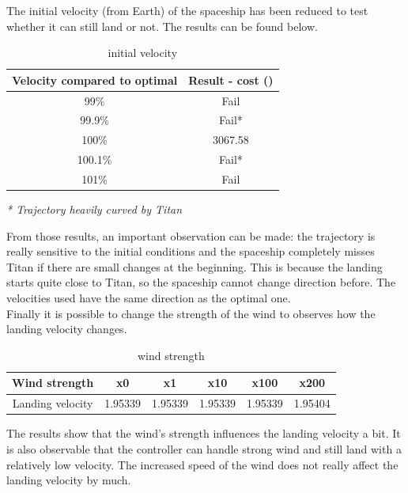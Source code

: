 \documentclass[10pt,a4paper]{article}
\begin{document}
	The initial velocity (from Earth) of the spaceship has been reduced to test whether it can still land or not. The results can be found below.\\
	
	\begin{table}[h]
		\begin{center}
			\begin{tabular}{|c||c|}
				\hline
				Velocity compared  to optimal & Result - cost (\officialeuro) \\
				\hline \hline
				99\% & Fail \\
				\hline
				99.9\% & Fail*\\
				\hline
				100\% & 3067.58 \\
				\hline
				100.1\% & Fail*\\
				\hline
				101\% & Fail \\
				\hline             
			\end{tabular}
			\begin{flushleft}
				\textit{* Trajectory heavily curved by Titan}
			\end{flushleft}    
			\caption{initial velocity}
		\end{center}
	\end{table}
	From those results, an important observation can be made: the trajectory is really sensitive to the initial conditions and the spaceship completely misses Titan if there are small changes at the beginning. This is because the landing starts quite close to Titan, so the spaceship cannot change direction before. The velocities used have the same direction as the optimal one.\\
	
	Finally it is possible to change the strength of the wind to observes how the landing velocity changes.
	
	\begin{table}[h]
		\begin{center}
			\begin{tabular}{|c||c|c|c|c|c|}
				\hline
				Wind strength & x0 & x1 & x10 & x100 & x200\\
				\hline \hline
				Landing velocity & 1.95339 & 1.95339 & 1.95339 & 1.95339 & 1.95404\\
				\hline
			\end{tabular}
			\caption{wind strength}
		\end{center}
	\end{table}
	
	The results show that the wind's strength influences the landing velocity a bit. It is also observable that the controller can handle strong wind and still land with a relatively low velocity. The increased speed of the wind does not really affect the landing velocity by much.\\
	
\end{document}
